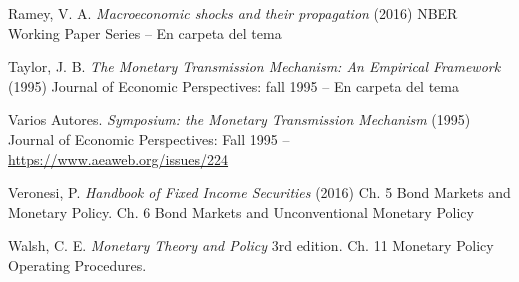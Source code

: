 \documentclass{nuevotema}
\begin{document}
Ramey, V. A. \textit{Macroeconomic shocks and their propagation} (2016) NBER Working Paper Series -- En carpeta del tema

Taylor, J. B. \textit{The Monetary Transmission Mechanism: An Empirical Framework} (1995) Journal of Economic Perspectives: fall 1995 -- En carpeta del tema

Varios Autores. \textit{Symposium: the Monetary Transmission Mechanism} (1995) Journal of Economic Perspectives: Fall 1995 -- \url{https://www.aeaweb.org/issues/224}

Veronesi, P. \textit{Handbook of Fixed Income Securities} (2016) Ch. 5 Bond Markets and Monetary Policy. Ch. 6 Bond Markets and Unconventional Monetary Policy

Walsh, C. E. \textit{Monetary Theory and Policy} 3rd edition. Ch. 11 Monetary Policy Operating Procedures.
\end{document}

